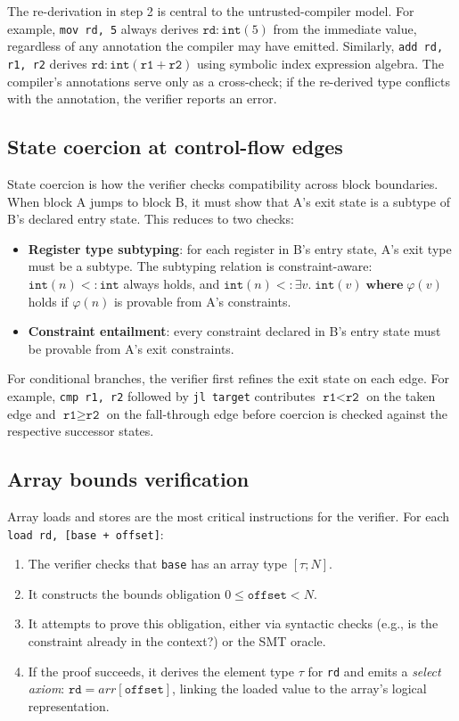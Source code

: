 The re-derivation in step 2 is central to the untrusted-compiler model. For example, \texttt{mov rd, 5} always derives $\texttt{rd} : \mathtt{int}(5)$ from the immediate value, regardless of any annotation the compiler may have emitted. Similarly, \texttt{add rd, r1, r2} derives $\texttt{rd} : \mathtt{int}(\texttt{r1} + \texttt{r2})$ using symbolic index expression algebra. The compiler's annotations serve only as a cross-check; if the re-derived type conflicts with the annotation, the verifier reports an error.

\subsection{State coercion at control-flow edges}

State coercion is how the verifier checks compatibility across block boundaries. When block A jumps to block B, it must show that A's exit state is a subtype of B's declared entry state. This reduces to two checks:

\begin{itemize}
  \item \textbf{Register type subtyping}: for each register in B's entry state, A's exit type must be a subtype. The subtyping relation is constraint-aware: $\mathtt{int}(n) <: \mathtt{int}$ always holds, and $\mathtt{int}(n) <: \exists v.\; \mathtt{int}(v) \;\mathbf{where}\; \varphi(v)$ holds if $\varphi(n)$ is provable from A's constraints.
  \item \textbf{Constraint entailment}: every constraint declared in B's entry state must be provable from A's exit constraints.
\end{itemize}

For conditional branches, the verifier first refines the exit state on each edge. For example, \texttt{cmp r1, r2} followed by \texttt{jl target} contributes $\texttt{r1} < \texttt{r2}$ on the taken edge and $\texttt{r1} \ge \texttt{r2}$ on the fall-through edge before coercion is checked against the respective successor states.

\subsection{Array bounds verification}

Array loads and stores are the most critical instructions for the verifier. For each \texttt{load rd, [base + offset]}:

\begin{enumerate}
  \item The verifier checks that \texttt{base} has an array type $[\tau; N]$.
  \item It constructs the bounds obligation $0 \le \texttt{offset} < N$.
  \item It attempts to prove this obligation, either via syntactic checks (e.g., is the constraint already in the context?) or the SMT oracle.
  \item If the proof succeeds, it derives the element type $\tau$ for \texttt{rd} and emits a \textit{select axiom}: $\texttt{rd} = \mathit{arr}[\texttt{offset}]$, linking the loaded value to the array's logical representation.
\end{enumerate}

